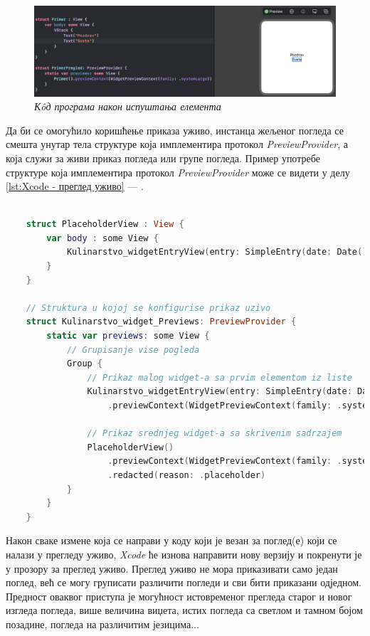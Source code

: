 \documentclass[12pt,oneside]{memoir}
\begin{document}
\begin{figure}[H]
\includegraphics[width=1\textwidth]{images/Drag_and_drop_2.png}
\centering
\caption{\textit{К\^{o}д програма након испуштања елемента}}
\label{slika:d&d2}
\end{figure}

Да би се омогућило коришћење приказа уживо, инстанца жељеног погледа се смешта унутар тела структуре која имплементира протокол \textit{PreviewProvider}, а која служи за живи приказ погледа или групе погледа. Пример употребе структуре која имплементира протокол \textit{PreviewProvider} може се видети у делу \ref{lst:Xcode - преглед уживо} --- .

\begin{lstlisting}[caption=\textit{{Xcode --- преглед уживо}}, label={lst:Xcode - преглед уживо}, language=Swift, frame=single]
    
    struct PlaceholderView : View {
        var body : some View {
            Kulinarstvo_widgetEntryView(entry: SimpleEntry(date: Date(), configuration: ConfigurationIntent(), recipe: RecipeModel.testData[0]))
        }
    }
    
    // Struktura u kojoj se konfigurise prikaz uzivo
    struct Kulinarstvo_widget_Previews: PreviewProvider {
        static var previews: some View {
            // Grupisanje vise pogleda
            Group {
                // Prikaz malog widget-a sa prvim elementom iz liste
                Kulinarstvo_widgetEntryView(entry: SimpleEntry(date: Date(), configuration: ConfigurationIntent(), recipe: RecipeModel.testData[0]))
                    .previewContext(WidgetPreviewContext(family: .systemSmall))
                
                // Prikaz srednjeg widget-a sa skrivenim sadrzajem
                PlaceholderView()
                    .previewContext(WidgetPreviewContext(family: .systemMedium))
                    .redacted(reason: .placeholder)
            }
        }
    }    
\end{lstlisting}

\indent Након сваке измене која се направи у коду који је везан за поглед(е) који се налази у прегледу уживо, \textit{Xcode} ће изнова направити нову верзију и покренути је у прозору за преглед уживо. Преглед уживо не мора приказивати само један поглед, већ се могу груписати различити погледи и сви бити приказани одједном. Предност оваквог приступа је могућност истовременог прегледа старог и новог изгледа погледа, више величина виџета, истих погледа са светлом и тамном бојом позадине, погледа на различитим језицима...
\end{document}
